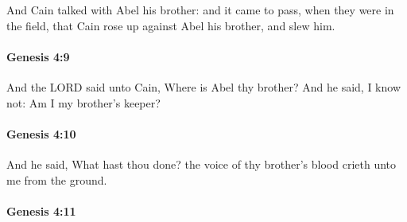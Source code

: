			And Cain talked with Abel his brother: and it came to pass, when they were in the field, that Cain rose up against Abel his brother, and slew him.


		\paragraph{Genesis 4:9} %
			\label{GENESIS-4-9}

			And the LORD said unto Cain, Where is Abel thy brother?  And he said, I know not: Am I my brother's keeper?


		\paragraph{Genesis 4:10} %
			\label{GENESIS-4-10}

			And he said, What hast thou done?  the voice of thy brother's blood crieth unto me from the ground.


		\paragraph{Genesis 4:11} %
			\label{GENESIS-4-11}

